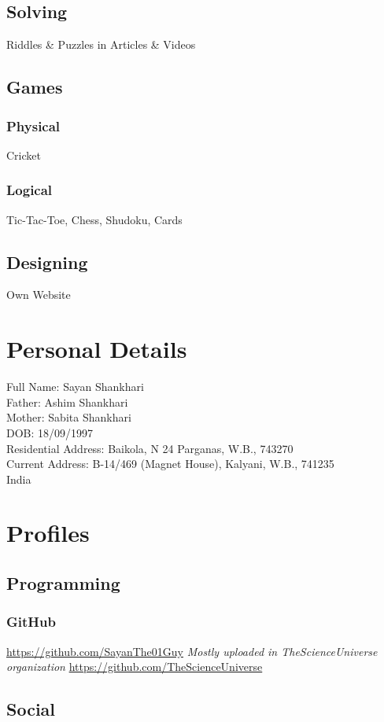 \documentclass{article}
\begin{document}
\subsection{Solving}
Riddles \& Puzzles in Articles \& Videos
\subsection{Games}
\subsubsection{Physical} Cricket
\subsubsection{Logical} Tic-Tac-Toe, Chess, Shudoku, Cards
\subsection{Designing} Own Website

\section{Personal Details}
Full Name: Sayan Shankhari\\
Father: Ashim Shankhari\\
Mother: Sabita Shankhari\\
DOB: 18/09/1997\\
Residential Address: Baikola, N 24 Parganas, W.B., 743270\\
Current Address: B-14/469 (Magnet House), Kalyani, W.B., 741235\\
India\\

\section{Profiles}
\subsection{Programming}
\subsubsection{GitHub}
\url{https://github.com/SayanThe01Guy}
\textit{Mostly uploaded in TheScienceUniverse organization}
\url{https://github.com/TheScienceUniverse}
\subsection{Social}
\end{document}
